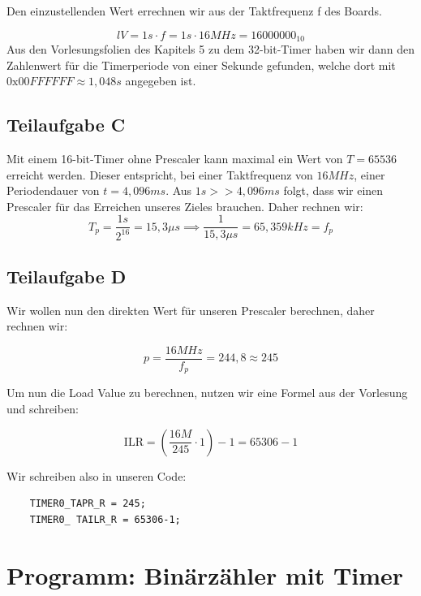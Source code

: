 \documentclass{article}
\begin{document}
Den einzustellenden Wert errechnen wir aus der Taktfrequenz f des Boards.

\begin{equation}
    lV = 1s \cdot f = 1s \cdot 16MHz = 16000000_{10}
\end{equation}
Aus den Vorlesungsfolien des Kapitels 5 zu dem 32-bit-Timer haben wir dann den Zahlenwert für die Timerperiode von einer Sekunde gefunden, welche dort mit $0\mathrm{x}00FFFFFF \approx 1,048s$ angegeben ist.

\subsection{Teilaufgabe C}

Mit einem 16-bit-Timer ohne Prescaler kann maximal ein Wert von $T = 65536$ erreicht werden. Dieser entspricht, bei einer Taktfrequenz von $16MHz$, einer Periodendauer von $t = 4,096 ms$. Aus $1s >> 4,096ms$ folgt, dass wir einen Prescaler für das Erreichen unseres Zieles brauchen. Daher rechnen wir:
\begin{equation}
    T_{p} = \frac{1s}{2^{16}} = 15,3\mu s \implies \frac{1}{15,3 \mu s} = 65,359kHz = f_p
\end{equation}

\subsection{Teilaufgabe D}

Wir wollen nun den direkten Wert für unseren Prescaler berechnen, daher rechnen wir:

\begin{equation}
    p = \frac{16MHz}{f_{p}} = 244,8 \approx 245
\end{equation}

Um nun die Load Value zu berechnen, nutzen wir eine Formel aus der Vorlesung und schreiben:

\begin{equation}
    \mathrm{ILR} = (\frac{16M}{245} \cdot 1) - 1 = 65306 - 1
\end{equation}

Wir schreiben also in unseren Code:

\begin{verbatim}
    TIMER0_TAPR_R = 245;
    TIMER0_ TAILR_R = 65306-1;
\end{verbatim}

\section{Programm: Binärzähler mit Timer}
\end{document}
